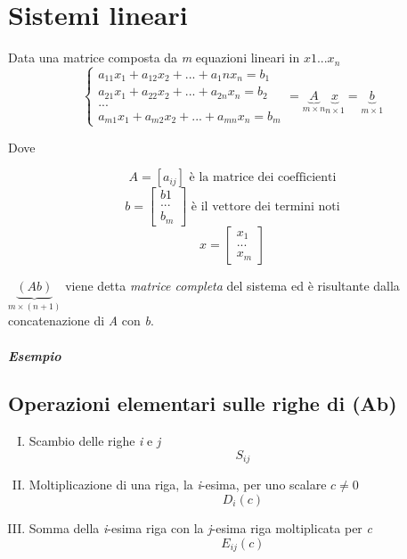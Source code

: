 \chapter{Sistemi lineari}
	Data una matrice composta da \textit{m} equazioni lineari in $ x1 ... x_n $
	$$ \begin{cases}
		a_{11} x_1 + a_{12} x_2 + ... + a_{1}n x_n = b_1 \\
		a_{21} x_1 + a_{22} x_2 + ... + a_{2n} x_n = b_2 \\
		... \\
		a_{m1} x_1 + a_{m2} x_2 + ... + a_{mn} x_n = b_m
		\end{cases} = 
		\underbrace{A}_{m \times n}\underbrace{x}_{n \times 1} = \underbrace{b}_{m \times 1} $$
		
		Dove
		
		$$ A = [a_{ij} ] \text{ è la matrice dei coefficienti} $$
		$$ b = \begin{bmatrix}
			b1 \\
			... \\
			b_m
		\end{bmatrix} \text{ è il vettore dei termini noti} $$
	 $$ x = \begin{bmatrix}
	 	x_1 \\
	 	... \\
	 	x_m
	 \end{bmatrix}$$
	
	$ \underbrace{(Ab)}_{m \times (n + 1)} $ viene detta \emph{matrice completa} del sistema ed è risultante dalla concatenazione di \textit{A} con \textit{b}.
	
	\paragraph{Esempio}
	\lipsum[2-4]
	
	\section{Operazioni elementari sulle righe di (Ab)}
		\begin{enumerate}[(I)]
			\item Scambio delle righe \textit{i} e \textit{j}
			$$ S_{ij}$$
			\item Moltiplicazione di una riga, la \textit{i}-esima, per uno scalare $ c \neq 0 $
			$$ D_i(c) $$
			\item Somma della \textit{i}-esima riga con la \textit{j}-esima riga moltiplicata per \textit{c}
			$$ E_{ij}(c) $$
		\end{enumerate}
		
